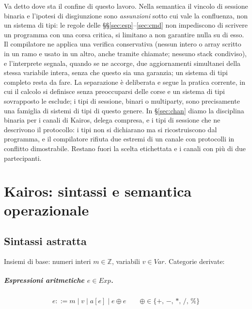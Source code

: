 \medskip
\noindent
Va detto dove sta il confine di questo lavoro. Nella semantica il vincolo di
sessione binaria e l'ipotesi di disgiunzione sono \emph{assunzioni} sotto cui
vale la confluenza, non un sistema di tipi: le regole delle
\S\S\ref{sec:esp}--\ref{sec:cmd} non impediscono di scrivere un programma con
una corsa critica, si limitano a non garantire nulla su di esso. Il compilatore
ne applica una verifica conservativa (nessun intero o array scritto in un ramo
e usato in un altro, anche tramite chiamate; nessuno stack condiviso), e
l'interprete segnala, quando se ne accorge, due aggiornamenti simultanei della
stessa variabile intera, senza che questo sia una garanzia; un sistema di tipi
completo resta da fare. La separazione è
deliberata e segue la pratica corrente, in cui il calcolo si definisce senza
preoccuparsi delle corse e un sistema di tipi sovrapposto le esclude; i tipi di
sessione, binari o multiparty, sono precisamente una famiglia di sistemi di tipi
di questo genere. In \S\ref{sec:chan} diamo la disciplina binaria per i canali di
Kairos, delega compresa, e i tipi di sessione che ne descrivono il protocollo:
i tipi non si dichiarano ma si ricostruiscono dal programma, e il compilatore
rifiuta due estremi di un canale con protocolli in conflitto dimostrabile. Restano fuori la scelta etichettata e i canali
con più di due partecipanti.

\chapter{Kairos: sintassi e semantica operazionale}
\label{chap:semantica}

\section{Sintassi astratta}
\label{sec:sintassi}

Insiemi di base: numeri interi $m \in \mathbb{Z}$, variabili $v \in \mathit{Var}$.
Categorie derivate:

\paragraph{Espressioni aritmetiche $e \in \mathit{Exp}$.}
\begin{align*}
e ::= m \mid v \mid a[e] \mid e \oplus e
\qquad
\oplus \in \{+,\,-,\,*,\,/,\,\%\}
\end{align*}


